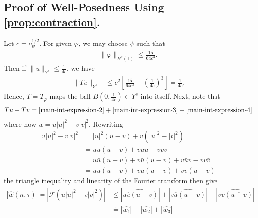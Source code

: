 \documentclass[12pt,reqno]{amsart}
\numberwithin{equation}{section}  %
\numberwithin{figure}{section}
\newcommand{\ci}{\mathbb{T}}
\newcommand{\wh}{\widehat}
\newcommand{\vp}{\varphi}
\theoremstyle{plain}
\theoremstyle{definition}
\theoremstyle{remark}
\begin{document}
\subsection{Proof of Well-Posedness Using  \autoref{prop:contraction}.} 
Let $c = c_{\psi}^{1/2}$. For given $\vp$, we may choose $\psi$ such
that 
%
\begin{equation*}
	\begin{split}
		\|\vp\|_{H^s(\ci)} \le \frac{15}{64c^3}.
	\end{split}
\end{equation*}
%
Then if $\|u\|_{Y^s} \le \frac{1}{4c}$, we have
%
\begin{equation*}
	\begin{split}
		\|T u \|_{Y^s} 
		& \le c^2 \left[ \frac{15}{64c^3} + \left( 
		\frac{1}{4c} \right)^3 \right]
		=  \frac{1}{4c}.
	\end{split}
\end{equation*}
%
Hence, $T=T_{\vp}$ maps the ball $B\left( 0, \frac{1}{4c} \right) \subset Y^s$ into 
itself. Next, note that
%
\begin{equation*}
	\begin{split}
		Tu - Tv = \eqref{main-int-expression-2} + \eqref{main-int-expression-3} 
		+ \eqref{main-int-expression-4}
	\end{split}
\end{equation*}
%
where now $w = u | u |^2 - v | v |^{2}$. Rewriting
%
\begin{equation*}
	\begin{split}
		u | u |^{2} - v | v |^{2}
		& = | u |^2 \left( u -v \right) + v\left( | u 
		|^2 - | v |^2
		\right)
		\\
		& = u \bar u \left( u -v \right) + v u \bar u - v v \bar v
		\\
		& = u \bar u \left( u - v \right) + v \bar u\left( u - v \right) + v 
		\bar u v - v v \bar v
		\\
		& = u \bar u \left( u -v \right) + v \bar u\left( u - v \right) + v v 
		\left( \overline{u -v} \right)
	\end{split}
\end{equation*}
%
the triangle inequality and linearity of the Fourier transform then give
%
\begin{equation*}
	\begin{split}
		| \wh{w}(n, \tau) | = | \mathcal{F}(u | u |^2 - v| v |^2) |
		& \le | \wh{u \overline{u} \left (u -v \right )} | +
		| \wh{v \overline{u} (u -v)} | + |\wh{v v 
		(\overline{u-v})}|
		\\
		& \doteq | \wh{w_1} | + | \wh{w_2} | + | \wh{w_3} |
	\end{split}
\end{equation*}
\end{document}
